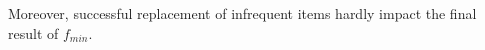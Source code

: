 %
%
%
%
%

%
%
%
Moreover, successful replacement of infrequent items hardly impact the final result of $f_{min}$.

%
